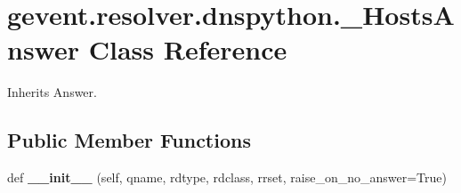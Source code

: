 \hypertarget{classgevent_1_1resolver_1_1dnspython_1_1___hosts_answer}{}\section{gevent.\+resolver.\+dnspython.\+\_\+\+Hosts\+Answer Class Reference}
\label{classgevent_1_1resolver_1_1dnspython_1_1___hosts_answer}


Inherits Answer.

\subsection*{Public Member Functions}
\begin{DoxyCompactItemize}
\item 
\mbox{\label{classgevent_1_1resolver_1_1dnspython_1_1___hosts_answer_aea07dc0ae0f65172925508008f7255db}} 
def {\bfseries \+\_\+\+\_\+init\+\_\+\+\_\+} (self, qname, rdtype, rdclass, rrset, raise\+\_\+on\+\_\+no\+\_\+answer=True)
\end{DoxyCompactItemize}
